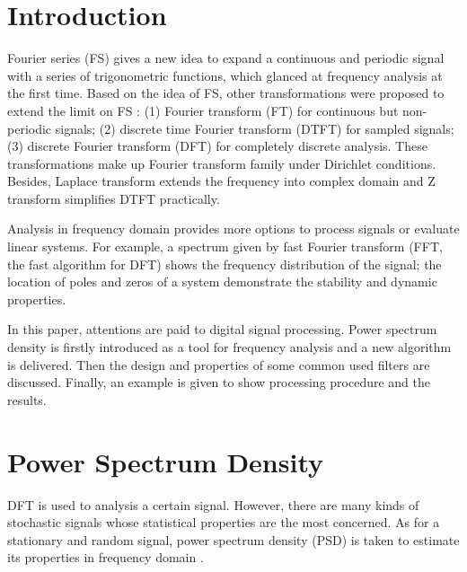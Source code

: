 \section{Introduction}


Fourier series (FS) gives a new idea to expand a continuous and periodic signal with a series of trigonometric functions, which glanced at frequency analysis at the first time. Based on the idea of FS, other transformations were proposed to extend the limit on FS \cite{SignalSystem}: (1) Fourier transform (FT) for continuous but non-periodic signals; (2) discrete time Fourier transform (DTFT) for sampled signals; (3) discrete Fourier transform (DFT) for completely discrete analysis. These transformations make up Fourier transform family under Dirichlet conditions. Besides, Laplace transform extends the frequency into complex domain and Z transform simplifies DTFT practically.


Analysis in frequency domain provides more options to process signals or evaluate linear systems. For example, a spectrum given by fast Fourier transform (FFT, the fast algorithm for DFT) shows the frequency distribution of the signal; the location of poles and zeros of a system demonstrate the stability and dynamic properties.


In this paper, attentions are paid to digital signal processing. Power spectrum density is firstly introduced as a tool for frequency analysis and a new algorithm is delivered. Then the design and properties of some common used filters are discussed. Finally, an example is given to show processing procedure and the results.




\section{Power Spectrum Density}


DFT is used to analysis a certain signal. However, there are many kinds of stochastic signals whose statistical properties are the most concerned. As for a stationary and random signal, power spectrum density (PSD) is taken to estimate its properties in frequency domain \cite{SignalDetect}.


